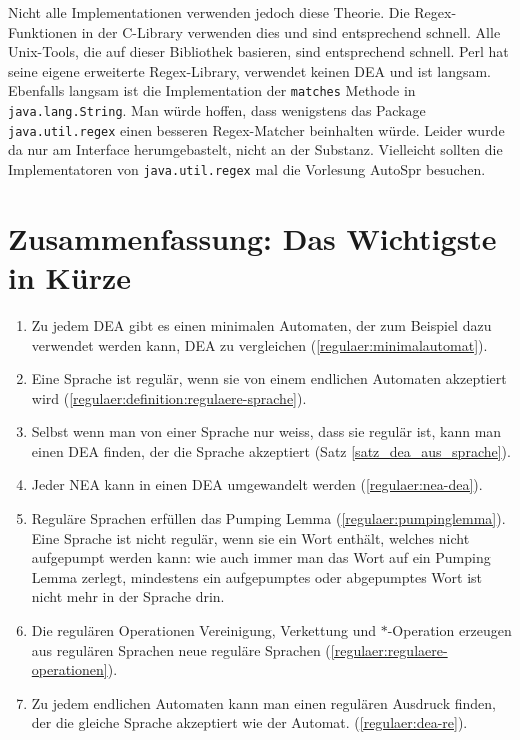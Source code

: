 \begin{sloppypar} %
Nicht alle Implementationen verwenden jedoch diese Theorie.
Die Regex-Funktionen in der C-Library verwenden dies und sind entsprechend
schnell.
Alle Unix-Tools, die auf dieser Bibliothek basieren, sind
entsprechend schnell.
Perl hat seine eigene erweiterte Regex-Library,
verwendet keinen DEA und ist langsam.
Ebenfalls langsam ist die
Implementation der {\tt matches} Methode in {\tt java.lang.String}.
Man würde hoffen, dass wenigstens das Package {\tt java.util.regex} einen
besseren Regex-Matcher beinhalten würde.
Leider wurde da nur am Interface herumgebastelt, nicht an der Substanz.
Vielleicht sollten
die Implementatoren von {\tt java.util.regex} mal die Vorlesung AutoSpr
besuchen.
\end{sloppypar}

\section{Zusammenfassung: Das Wichtigste in Kürze}
\begin{enumerate}
\item Zu jedem DEA gibt es einen
minimalen Automaten, der zum Beispiel dazu verwendet werden kann,
DEA zu vergleichen
(\ref{regulaer:minimalautomat}).
\item Eine Sprache ist regulär, wenn sie von einem endlichen Automaten
akzeptiert wird (\ref{regulaer:definition:regulaere-sprache}).
\item Selbst wenn man von einer Sprache nur weiss, dass sie regulär
ist, kann man einen DEA finden, der die Sprache akzeptiert
(Satz \ref{satz_dea_aus_sprache}).
\item Jeder NEA kann in einen DEA umgewandelt werden (\ref{regulaer:nea-dea}).
\item Reguläre Sprachen erfüllen das Pumping Lemma
(\ref{regulaer:pumpinglemma}).
Eine Sprache ist nicht regulär, wenn sie ein Wort enthält, welches
nicht aufgepumpt werden kann: wie auch immer man das Wort
auf ein Pumping Lemma zerlegt, mindestens ein aufgepumptes
oder abgepumptes Wort ist nicht mehr in der Sprache drin.
\item Die regulären Operationen Vereinigung, Verkettung und $*$-Operation
erzeugen aus regulären Sprachen neue reguläre Sprachen
(\ref{regulaer:regulaere-operationen}).
\item Zu jedem endlichen Automaten kann man einen regulären Ausdruck
finden, der die gleiche Sprache akzeptiert wie der Automat.
(\ref{regulaer:dea-re}).
\end{enumerate}
